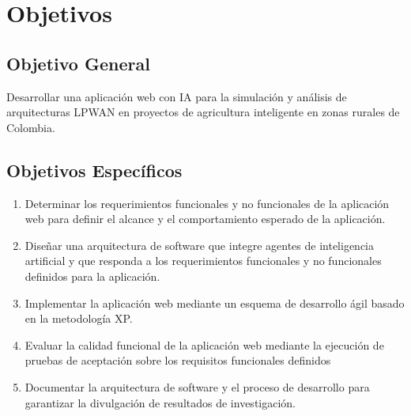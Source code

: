 \chapter{Objetivos}

\section{Objetivo General}

Desarrollar una aplicación web con IA para la simulación y análisis
de arquitecturas LPWAN en proyectos de agricultura inteligente en zonas rurales de Colombia.

\section{Objetivos Específicos}

\begin{enumerate}
      \item Determinar los requerimientos funcionales y no funcionales de la
            aplicación web para definir el alcance y el comportamiento
            esperado de la aplicación.
      \item Diseñar una arquitectura de software que integre agentes de
            inteligencia artificial y que responda a los requerimientos
            funcionales y no funcionales definidos para la aplicación.
      \item Implementar la aplicación web mediante un esquema de desarrollo
            ágil basado en la metodología XP.
      \item Evaluar la calidad funcional de la aplicación web mediante
            la ejecución de pruebas de aceptación sobre los requisitos
            funcionales definidos
      \item Documentar la arquitectura de software y el proceso de
            desarrollo para garantizar la
            divulgación de resultados de investigación.
\end{enumerate}
